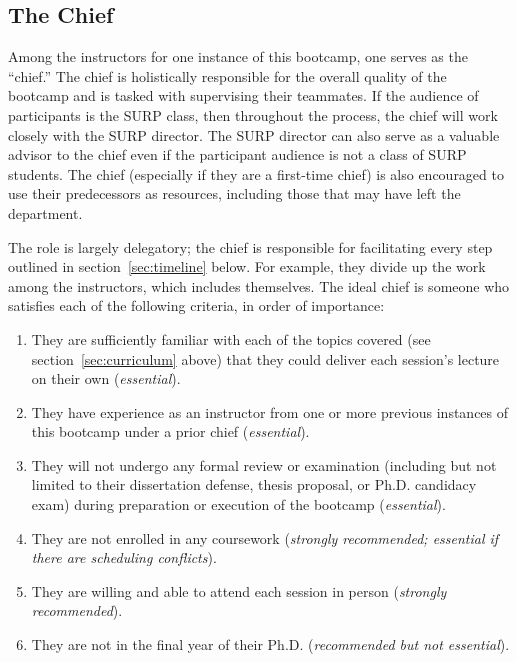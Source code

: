 \subsection{The Chief}
\label{sec:instructors:chief}
\noindent
Among the instructors for one instance of this bootcamp, one serves as the
``chief.''
The chief is holistically responsible for the overall quality of the bootcamp
and is tasked with supervising their teammates.
If the audience of participants is the SURP class, then throughout the process,
the chief will work closely with the SURP director.
The SURP director can also serve as a valuable advisor to the chief even if the
participant audience is not a class of SURP students.
The chief (especially if they are a first-time chief) is also encouraged to use
their predecessors as resources, including those that may have left the
department.
\par
The role is largely delegatory; the chief is responsible for facilitating
every step outlined in section~\ref{sec:timeline} below.
For example, they divide up the work among the instructors, which includes
themselves.
The ideal chief is someone who satisfies each of the following criteria, in
order of importance:
\begin{enumerate}[topsep=0pt, itemsep=0pt, partopsep=0pt, parsep=0pt]

	\item They are sufficiently familiar with each of the topics covered (see
	section~\ref{sec:curriculum} above) that they could deliver each session's
	lecture on their own (\textit{essential}).

	\item They have experience as an instructor from one or more previous
	instances of this bootcamp under a prior chief (\textit{essential}).

	\item They will not undergo any formal review or examination (including but
	not limited to their dissertation defense, thesis proposal, or Ph.D.
	candidacy exam) during preparation or execution of the bootcamp
	(\textit{essential}).

	\item They are not enrolled in any coursework (\textit{strongly
	recommended; essential if there are scheduling conflicts}).

	\item They are willing and able to attend each session in person
	(\textit{strongly recommended}).

	\item They are not in the final year of their Ph.D. (\textit{recommended
	but not essential}).
\end{enumerate}
